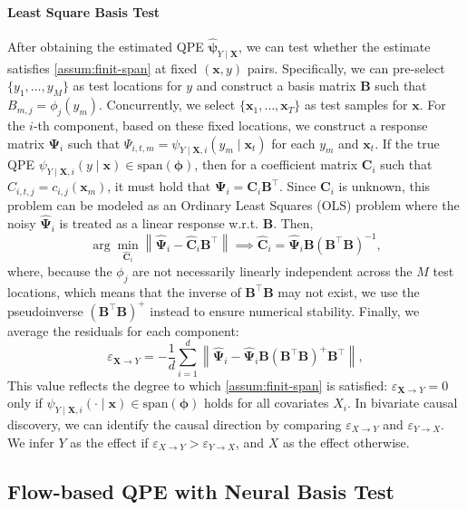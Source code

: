 \documentclass{article}
\theoremstyle{plain}
\theoremstyle{definition}
\theoremstyle{remark}
\begin{document}
\paragraph{Least Square Basis Test} After obtaining the estimated QPE $\hat{\bm{\psi}}_{Y\mid\bm{X}}$, we can test whether the estimate satisfies \cref{assum:finit-span} at fixed $(\bm{x},y)$ pairs. Specifically, we can pre-select $\{y_1,\dots,y_M\}$ as test locations for $y$ and construct a basis matrix $\bm{B}$ such that $B_{m,j}=\phi_j(y_m)$. Concurrently, we select $\{\bm{x}_1,\dots,\bm{x}_T\}$ as test samples for $\bm{x}$. For the $i$-th component, based on these fixed locations, we construct a response matrix $\bm{\Psi}_i$ such that $\Psi_{i,t,m}=\psi_{Y\mid\bm{X},i}(y_m\!\mid\!\bm{x}_t)$ for each $y_m$ and $\bm{x}_t$. If the true QPE $\psi_{Y\mid\bm{X},i}(y\!\mid\!\bm{x})\in\text{span}(\bm{\phi})$, then for a coefficient matrix $\bm{C}_i$ such that $C_{i,t,j}=c_{i,j}(\bm{x}_m)$, it must hold that $\bm{\Psi}_i=\bm{C}_i\bm{B}^\intercal$. Since $\bm{C}_i$ is unknown, this problem can be modeled as an Ordinary Least Squares (OLS) problem where the noisy $\hat{\bm{\Psi}}_i$ is treated as a linear response w.r.t. $\bm{B}$. Then,
\[\arg\min_{\hat{\bm{C}}_i}\left\|\hat{\bm{\Psi}}_i-\hat{\bm{C}}_i\bm{B}^\intercal\right\|\implies\hat{\bm{C}}_i=\hat{\bm{\Psi}}_i\bm{B}(\bm{B}^\intercal\bm{B})^{-1},\]
where, because the $\phi_j$ are not necessarily linearly independent across the $M$ test locations, which means that the inverse of $\bm{B}^\intercal\bm{B}$ may not exist, we use the pseudoinverse $(\bm{B}^\intercal\bm{B})^{+}$ instead to ensure numerical stability. Finally, we average the residuals for each component:
\[\varepsilon_{\bm{X}\to Y}=-\frac{1}{d}\sum_{i=1}^d\left\|\hat{\bm{\Psi}}_i-\hat{\bm{\Psi}}_i\bm{B}(\bm{B}^\intercal\bm{B})^{+}\bm{B}^\intercal\right\|,\]
This value reflects the degree to which \cref{assum:finit-span} is satisfied: $\varepsilon_{\bm{X}\to Y}=0$ only if $\psi_{Y\mid\bm{X},i}(\cdot\!\mid\!\bm{x})\in\text{span}(\bm{\phi})$ holds for all covariates $X_i$. In bivariate causal discovery, we can identify the causal direction by comparing $\varepsilon_{X\to Y}$ and $\varepsilon_{Y\to X}$. We infer $Y$ as the effect if $\varepsilon_{X\to Y}>\varepsilon_{Y\to X}$, and $X$ as the effect otherwise.%
\subsection{Flow-based QPE with Neural Basis Test}
\label{ssec:qpe-f}
\end{document}
